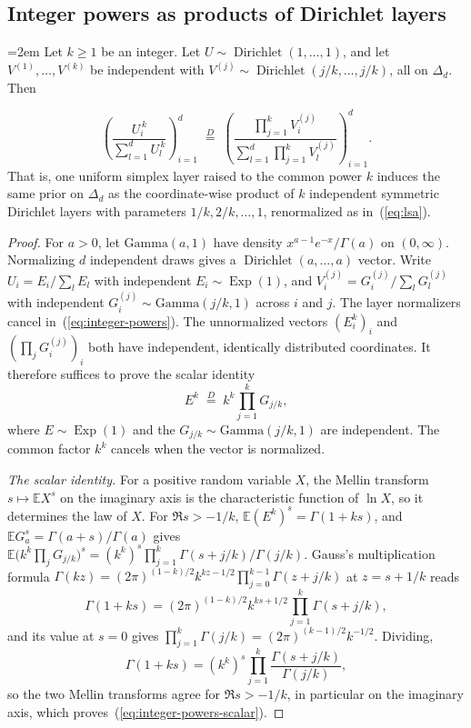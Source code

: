 \documentclass[anon]{alt2027}
\newcommand{\simplex}{\Delta_d}
\newcommand{\Exp}{\operatorname{Exp}}
\newcommand{\Dir}{\operatorname{Dirichlet}}
\newcommand{\E}{\mathbb{E}}
\renewcommand{\eqref}[1]{(\ref{#1})}
\begin{document}
\subsection{Integer powers as products of Dirichlet layers}
\begin{theorem}
\label{thm:integer-powers}
\mbox{}\par
{\emergencystretch=2em
Let $k\ge1$ be an integer. Let $U\sim\Dir(1,\dots,1)$, and let $V^{(1)},\dots,V^{(k)}$ be independent with $V^{(j)}\sim\Dir(j/k,\dots,j/k)$, all on $\simplex$. Then
\par}
\begin{equation}
\left(\frac{U_i^{\,k}}{\sum_{l=1}^dU_l^{\,k}}\right)_{i=1}^d
\;\stackrel{D}{=}\;
\left(\frac{\prod_{j=1}^kV^{(j)}_i}{\sum_{l=1}^d\prod_{j=1}^kV^{(j)}_l}\right)_{i=1}^d .
\label{eq:integer-powers}
\end{equation}
That is, one uniform simplex layer raised to the common power $k$ induces the same prior on $\simplex$ as the coordinate-wise product of $k$ independent symmetric Dirichlet layers with parameters $1/k,2/k,\dots,1$, renormalized as in~\eqref{eq:lsa}.
\end{theorem}
\begin{proof}
For $a>0$, let $\mathrm{Gamma}(a,1)$ have density $x^{a-1}e^{-x}/\Gamma(a)$ on $(0,\infty)$. Normalizing $d$ independent draws gives a $\Dir(a,\dots,a)$ vector. Write $U_i=E_i/\sum_lE_l$ with independent $E_i\sim\Exp(1)$, and $V_i^{(j)}=G_i^{(j)}/\sum_lG_l^{(j)}$ with independent $G_i^{(j)}\sim\mathrm{Gamma}(j/k,1)$ across $i$ and $j$. The layer normalizers cancel in~\eqref{eq:integer-powers}. The unnormalized vectors $(E_i^k)_i$ and $(\prod_jG_i^{(j)})_i$ both have independent, identically distributed coordinates. It therefore suffices to prove the scalar identity
\begin{equation}
E^k\;\stackrel{D}{=}\;k^k\prod_{j=1}^kG_{j/k},
\label{eq:integer-powers-scalar}
\end{equation}
where $E\sim\Exp(1)$ and the $G_{j/k}\sim\mathrm{Gamma}(j/k,1)$ are independent. The common factor $k^k$ cancels when the vector is normalized.

\emph{The scalar identity.} For a positive random variable $X$, the Mellin transform $s\mapsto\E X^s$ on the imaginary axis is the characteristic function of $\ln X$, so it determines the law of $X$. For $\Re s>-1/k$, $\E(E^k)^s=\Gamma(1+ks)$, and $\E G_a^s=\Gamma(a+s)/\Gamma(a)$ gives $\E\bigl(k^k\prod_jG_{j/k}\bigr)^s=(k^k)^s\prod_{j=1}^k\Gamma(s+j/k)/\Gamma(j/k)$. Gauss's multiplication formula $\Gamma(kz)=(2\pi)^{(1-k)/2}k^{kz-1/2}\prod_{j=0}^{k-1}\Gamma(z+j/k)$ at $z=s+1/k$ reads
\[
\Gamma(1+ks)=(2\pi)^{(1-k)/2}k^{ks+1/2}\prod_{j=1}^k\Gamma(s+j/k),
\]
and its value at $s=0$ gives $\prod_{j=1}^k\Gamma(j/k)=(2\pi)^{(k-1)/2}k^{-1/2}$. Dividing,
\[
\Gamma(1+ks)=(k^k)^s\prod_{j=1}^k\frac{\Gamma(s+j/k)}{\Gamma(j/k)},
\]
so the two Mellin transforms agree for $\Re s>-1/k$, in particular on the imaginary axis, which proves~\eqref{eq:integer-powers-scalar}.
\end{proof}
\end{document}

